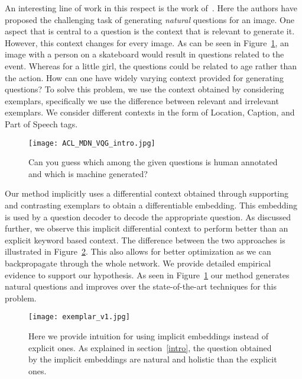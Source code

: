 \documentclass[11pt,a4paper]{article}
\begin{document}
\noindent An interesting line of work in this respect is the work of~\cite{mostafazadeh2016generating}. Here the authors have proposed the challenging task of generating {\em natural} questions for an image.  One aspect that is central to a question is the context that is relevant to generate it. However, this context changes for every image. As can be seen in Figure~\ref{fig:vqg_result}, an image with a person on a skateboard would result in questions related to the event. Whereas for a little girl, the questions could be related to age rather than the action. How can one have widely varying context provided for generating questions? To solve this problem, we use the context obtained by considering exemplars, specifically we use the difference between relevant and irrelevant exemplars. We consider different contexts in the form of Location, Caption, and Part of Speech tags.
\begin{figure}[ht]
\centering
	\texttt{[image: ACL\_MDN\_VQG\_intro.jpg]}
	\vspace{-0.7cm}
	\caption{Can you guess which among the given questions is human annotated and which is machine generated? \footnotemark[0] }
	\label{fig:vqg_result}
\end{figure}





\noindent Our method implicitly uses a differential context obtained through supporting  and contrasting exemplars to obtain a differentiable embedding. This embedding is used by a question decoder to decode the appropriate question. As discussed further, we observe this implicit differential context to perform better than an explicit keyword based context. The difference between the two approaches is illustrated in  Figure~\ref{fig:exemplar_v1}. This also allows for better optimization as we can backpropagate through the whole network. We provide detailed empirical evidence to support our hypothesis. As seen in Figure~\ref{fig:vqg_result} our method generates natural questions and improves over the state-of-the-art techniques for this problem. 


\begin{figure}[ht]
\centering
\texttt{[image: exemplar\_v1.jpg]}
\vspace{-0.7cm}
\caption{Here we provide intuition for using implicit embeddings instead of explicit ones. As explained in section~\ref{intro}, the question obtained by the implicit embeddings are natural and holistic than the explicit ones.}
\label{fig:exemplar_v1}
\end{figure} 
\end{document}
